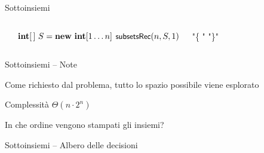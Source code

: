 \begin{frame}{Sottoinsiemi}

\vspace{-9pt}

\vspace{-12pt}
\begin{columns}[T]
\begin{Procedure}
\caption[A]{(\INTEGER $n$, $\INTEGER[\,]\ S$, \INTEGER $i$)}
\end{Procedure}
\begin{Procedure}
\caption[A]{\enumerasottoinsiemi(\INTEGER $n$)}
$\INTEGER[\,]\ S = \NEW\ \INTEGER[1 \ldots n]$\;
$\textsf{{\small subsetsRec}}(n, S,1)$\;
\end{Procedure}

\vspace{-12pt}
\begin{Procedure}
\caption[A]{\processSolution($\INTEGER[\,]\ S$, \INTEGER $n$)}
  \PRINT "\{ "\;
  \PRINTLN "\}"
\end{Procedure}

\end{columns}

\end{frame}

\begin{frame}{Sottoinsiemi -- Note}
	
\BIL
\item Come richiesto dal problema, tutto lo spazio possibile viene esplorato
\item Complessità $\Theta(n \cdot 2^n)$
\item In che ordine vengono stampati gli insiemi?
\EIL

\end{frame}

\begin{frame}{Sottoinsiemi -- Albero delle decisioni}

\begin{center}
\scalebox{1.5}{

}
\end{center}

\end{frame}






